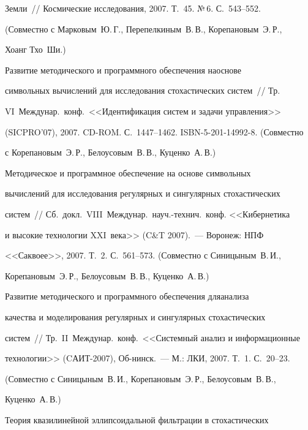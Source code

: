 Земли~// Космические исследования, 2007. Т.~45. №\,6. С.~543--552.


(Совместно с Марковым~Ю.\,Г., Перепелкиным~В.\,В., Корепановым~Э.\,Р.,


Хоанг Тхо~Ши.)





 Развитие методического и программного обеспечения на\linebreak осно\-ве


символьных вычислений для исследования стохастических систем~// Тр.\


VI~Междунар.\ конф.\ <<Идентификация систем и задачи управления>>


(SICPRO'07), 2007. CD-ROM. С.~1447--1462. ISBN-5-201-14992-8. (Совместно


с Корепановым~Э.\,Р., Белоусовым~В.\,В., Куценко~А.\,В.)





 Методическое и программное обеспечение на основе символьных


вычислений для исследования регулярных и сингулярных стохастических


систем~// Сб.\ докл.\ VIII~Междунар.\ науч.-тех\-нич.\ конф. <<Кибернетика


и высокие технологии XXI~века>> (C\&T 2007).~--- Воронеж: НПФ


<<Саквоее>>, 2007. Т.~2. С.~561--573. (Совместно с Синицыным~В.\,И.,


Корепановым~Э.\,Р., Белоусовым~В.\,В., Куценко~А.\,В.)





 Развитие методического и программного обеспечения для\linebreak анализа


качества и моделирования регулярных и сингулярных стохастических


систем~// Тр.\ II~Междунар.\ конф.\ <<Системный анализ и информационные


технологии>> (CАИТ-2007), Об-\linebreak нинск.~--- М.: ЛКИ, 2007. Т.~1. С.~20--23.


(Совместно с Синицыным~В.\,И., Корепановым~Э.\,Р., Белоусовым~В.\,В.,


Куценко~А.\,В.)





 Теория квазилинейной эллипсоидальной фильтрации в стохастических


